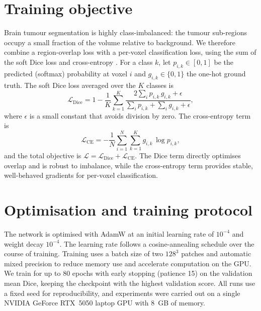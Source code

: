 \section{Training objective}
\label{sec:loss}

Brain tumour segmentation is highly class-imbalanced: the tumour sub-regions
occupy a small fraction of the volume relative to background. We therefore combine
a region-overlap loss with a per-voxel classification loss, using the sum of the
soft Dice loss and cross-entropy \citep{milletari2016vnet,sudre2017generalised}.
For a class $k$, let $p_{i,k}\in[0,1]$ be the predicted (softmax) probability at
voxel $i$ and $g_{i,k}\in\{0,1\}$ the one-hot ground truth. The soft Dice loss
averaged over the $K$ classes is
\begin{equation}
\mathcal{L}_{\mathrm{Dice}} = 1 - \frac{1}{K}\sum_{k=1}^{K}
\frac{2\sum_{i} p_{i,k}\,g_{i,k} + \epsilon}
     {\sum_{i} p_{i,k} + \sum_{i} g_{i,k} + \epsilon},
\end{equation}
where $\epsilon$ is a small constant that avoids division by zero. The
cross-entropy term is
\begin{equation}
\mathcal{L}_{\mathrm{CE}} = -\frac{1}{N}\sum_{i=1}^{N}\sum_{k=1}^{K}
g_{i,k}\,\log p_{i,k},
\end{equation}
and the total objective is $\mathcal{L} = \mathcal{L}_{\mathrm{Dice}} +
\mathcal{L}_{\mathrm{CE}}$. The Dice term directly optimises overlap and is robust
to imbalance, while the cross-entropy term provides stable, well-behaved gradients
for per-voxel classification.

\section{Optimisation and training protocol}
\label{sec:training}

The network is optimised with AdamW \citep{loshchilov2019adamw} at an initial
learning rate of $10^{-4}$ and weight decay $10^{-4}$. The learning rate follows a
cosine-annealing schedule \citep{loshchilov2017sgdr} over the course of training.
Training uses a batch size of two $128^3$ patches and automatic mixed precision to
reduce memory use and accelerate computation on the GPU. We train for up to 80
epochs with early stopping (patience 15) on the validation mean Dice, keeping the
checkpoint with the highest validation score. All runs use a fixed seed for
reproducibility, and experiments were carried out on a single NVIDIA GeForce
RTX~5050 laptop GPU with 8~GB of memory.

